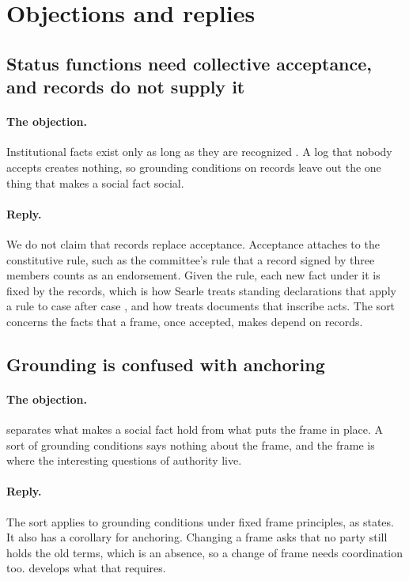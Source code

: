 \section{Objections and replies}\label{sec:objections}

\subsection{Status functions need collective acceptance, and records do not supply it}
\label{sec:obj-acceptance}

\paragraph{The objection.} Institutional facts exist only as long as they are recognized
\citep{searle1995,searle2010}. A log that nobody accepts creates nothing, so grounding conditions on
records leave out the one thing that makes a social fact social.

\paragraph{Reply.} We do not claim that records replace acceptance. Acceptance attaches to the
constitutive rule, such as the committee's rule that a record signed by three members counts as an
endorsement. Given the rule, each new fact under it is fixed by the records, which is how Searle
treats standing declarations that apply a rule to case after case \citep{searle2010}, and how
\citet{ferraris2013} treats documents that inscribe acts. The sort concerns the facts that a frame,
once accepted, makes depend on records.

\subsection{Grounding is confused with anchoring}\label{sec:obj-anchoring}

\paragraph{The objection.} \citet{epstein2015} separates what makes a social fact hold from what
puts the frame in place. A sort of grounding conditions says nothing about the frame, and the frame
is where the interesting questions of authority live.

\paragraph{Reply.} The sort applies to grounding conditions under fixed frame principles, as
 states. It also has a corollary for anchoring. Changing a frame asks that no
party still holds the old terms, which is an absence, so a change of frame needs coordination too.
 develops what that requires.

